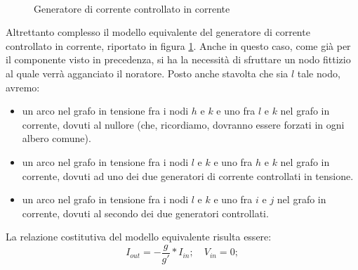 \begin{figure}[b]
 \centering
 \\
 \caption{Generatore di corrente controllato in corrente}
 \label{fig:cccscmp}
\end{figure}

Altrettanto complesso il modello equivalente del generatore di corrente controllato in corrente, riportato in figura \ref{fig:cccscmp}. Anche in questo caso, come già per il componente visto in precedenza, si ha la necessità di sfruttare un nodo fittizio al quale verrà agganciato il noratore. Posto anche stavolta che sia $l$ tale nodo, avremo:
\begin{itemize}
 \item un arco nel grafo in tensione fra i nodi $h$ e $k$ e uno fra $l$ e $k$ nel grafo in corrente, dovuti al nullore (che, ricordiamo, dovranno essere forzati in ogni albero comune).
 \item un arco nel grafo in tensione fra i nodi $l$ e $k$ e uno fra $h$ e $k$ nel grafo in corrente, dovuti ad uno dei due generatori di corrente controllati in tensione.
 \item un arco nel grafo in tensione fra i nodi $l$ e $k$ e uno fra $i$ e $j$ nel grafo in corrente, dovuti al secondo dei due generatori controllati.
\end{itemize}
La relazione costitutiva del modello equivalente risulta essere:
$$ I_{out} = -\frac{g}{g'}\ast I_{in};\quad V_ {in} = 0; $$

